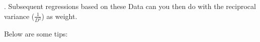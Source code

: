 {\begin{enumerate}


\end{enumerate}
}
\lang{en}{
Giving a confidence interval of just over 68%
More to read here:
\url{http://en.wikipedia.org/wiki/68-95-99.7\_rule}
}. Subsequent regressions based on these
Data can you then do with the reciprocal variance ($\frac{1}{D ^ 2} $) as
weight.

Below are some tips:

